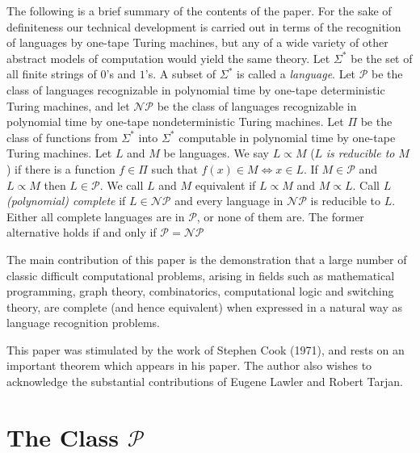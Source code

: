 \documentclass{scrartcl}
\begin{document}
The following is a brief summary of the contents of the paper.
For the sake of definiteness our technical development is carried out in terms of the recognition of languages by one-tape Turing machines, but any of a wide variety of other abstract models of computation would yield the same theory.
Let \(\Sigma^{*}\) be the set of all finite strings of \(0\)'s and \(1\)'s.
A subset of \(\Sigma^{*}\) is called a \emph{language}.
Let \(\mathcal{P}\) be the class of languages recognizable in polynomial time by one-tape deterministic Turing machines, and let \(\mathcal{NP}\) be the class of languages recognizable in polynomial time by one-tape nondeterministic Turing machines.
Let \(\Pi\) be the class of functions from \(\Sigma^{*}\) into \(\Sigma^{*}\) computable in polynomial time by one-tape Turing machines.
Let \(L\) and \(M\) be languages.
We say \(L \propto M\) (\(L\) \emph{is reducible to} \(M\)) if there is a function \(f \in \Pi\) such that \(f(x) \in M \Leftrightarrow x \in L\).
If \(M \in \mathcal{P}\) and \(L \propto M\) then \(L \in \mathcal{P}\).
We call \(L\) and \(M\) equivalent if \(L \propto M\) and \(M \propto L\).
Call \(L\) \emph{(polynomial) complete} if \(L \in \mathcal{NP}\) and every language in \(\mathcal{NP}\) is reducible to \(L\).
Either all complete languages are in \(\mathcal{P}\), or none of them are. The former alternative holds if and only if \(\mathcal{P} = \mathcal{NP}\)

The main contribution of this paper is the demonstration that a large number of classic difficult computational problems, arising in fields such as mathematical programming, graph theory, combinatorics, computational logic and switching theory, are complete (and hence equivalent) when expressed in a natural way as language recognition problems.

This paper was stimulated by the work of Stephen Cook (1971), and rests on an important theorem which appears in his paper.
The author also wishes to acknowledge the substantial contributions of Eugene Lawler and Robert Tarjan.

\section{The Class \(\mathcal{P}\)}
\end{document}

